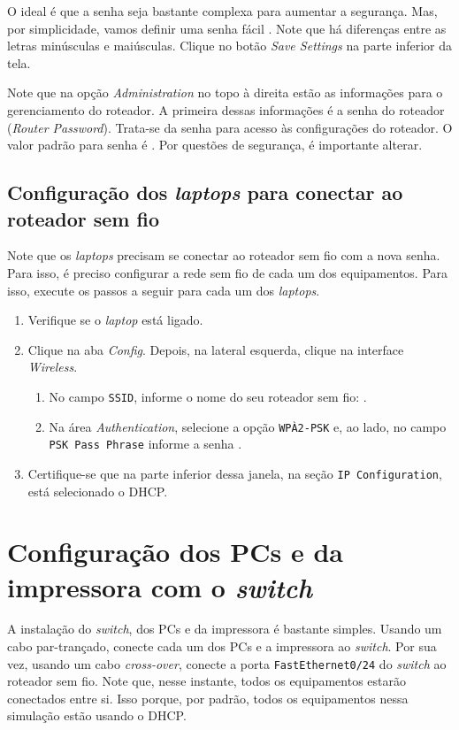 O ideal é que a senha seja bastante complexa para aumentar a segurança. Mas, por simplicidade, vamos definir uma senha fácil . Note que há diferenças entre as letras minúsculas e maiúsculas. Clique no botão \textit{Save Settings} na parte inferior da tela.

Note que na opção \textit{Administration} no topo à direita estão as informações para o gerenciamento do roteador. A primeira dessas informações é a senha do roteador (\textit{Router Password}). Trata-se da senha para acesso às configurações do roteador. O valor padrão para senha é . Por questões de segurança, é importante alterar.

\subsection{Configuração dos \textit{laptops} para conectar ao roteador sem fio}
Note que os \textit{laptops} precisam se conectar ao roteador sem fio com a nova senha. Para isso, é preciso configurar a rede sem fio de cada um dos equipamentos. Para isso, execute os passos a seguir para cada um dos \textit{laptops}.

\begin{enumerate}[label*=\arabic*.]
  \item Verifique se o \textit{laptop} está ligado.
  \item Clique na aba \textit{Config}. Depois, na lateral esquerda, clique na interface \textit{Wireless}.
  \begin{enumerate}[label*=\arabic*.]
    \item No campo \texttt{SSID}, informe o nome do seu roteador sem fio: .
    \item Na área \textit{Authentication}, selecione a opção \texttt{WPÀ2-PSK} e, ao lado, no campo \texttt{PSK Pass Phrase} informe a senha  .
   \end{enumerate}
   \item Certifique-se que na parte inferior dessa janela, na seção \texttt{IP Configuration}, está selecionado o DHCP. 
\end{enumerate}

\section{Configuração dos PCs e da impressora com o \textit{switch}}\label{sec:PCsSwitchDHCP}
A instalação do \textit{switch}, dos PCs e da impressora é bastante simples. Usando um cabo par-trançado, conecte cada um dos PCs e a impressora ao \textit{switch}. Por sua vez, usando um cabo \textit{cross-over}, conecte a porta \texttt{FastEthernet0/24} do \textit{switch} ao roteador sem fio. Note que, nesse instante, todos os equipamentos estarão conectados entre si. Isso porque, por padrão, todos os equipamentos nessa simulação estão usando o DHCP.

